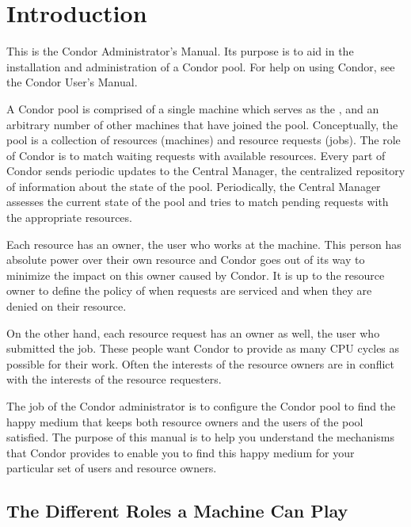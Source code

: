 \section{Introduction}
\label{sec:Admin-Intro}

This is the Condor Administrator's Manual.  Its purpose is to aid in
the installation and administration of a Condor pool.  For help on
using Condor, see the Condor User's Manual.  

A Condor pool is comprised of a single machine which serves as the
, and an arbitrary number of other machines that
have joined the pool.  Conceptually, the pool is a collection of
resources (machines) and resource requests (jobs).  The role of Condor
is to match waiting requests with available resources.  Every part of
Condor sends periodic updates to the Central Manager, the centralized
repository of information about the state of the pool.  Periodically,
the Central Manager assesses the current state of the pool and tries
to match pending requests with the appropriate resources.  

Each resource has an owner, the user who works at the machine.  This
person has absolute power over their own resource and Condor goes out
of its way to minimize the impact on this owner caused by Condor.  It
is up to the resource owner to define the policy of when requests are
serviced and when they are denied on their resource.

On the other hand, each resource request has an owner as well, the
user who submitted the job.  These people want Condor to provide as
many CPU cycles as possible for their work.  Often the interests of
the resource owners are in conflict with the interests of the resource
requesters.  

The job of the Condor administrator is to configure the Condor pool to
find the happy medium that keeps both resource owners and the users of
the pool satisfied.  The purpose of this manual is to help you
understand the mechanisms that Condor provides to enable you to find
this happy medium for your particular set of users and resource owners.

\subsection{The Different Roles a Machine Can Play}
\label{sec:Machine-Roles}

